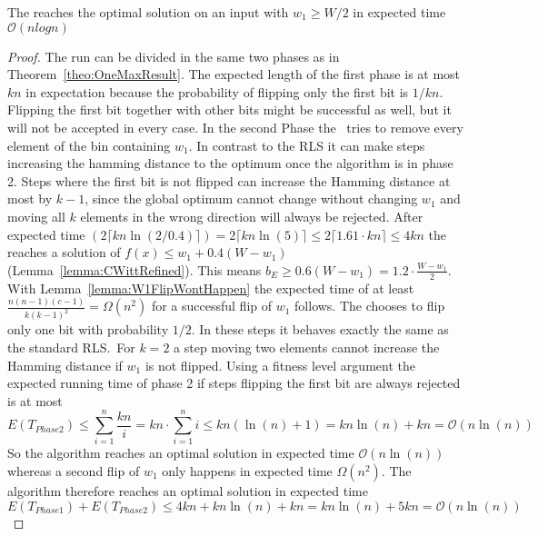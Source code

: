 \begin{lemma}
      The \RLSR[k=2] reaches the optimal solution on an input with $w_1\ge W/2$ in expected time $\mathcal{O}(nlogn)$
\end{lemma}
\begin{proof}
      The run can be divided in the same two phases as in Theorem~\ref{theo:OneMaxResult}.
      The expected length of the first phase is at most $kn$ in expectation because the probability of flipping only the first bit is $1/kn$.
      Flipping the first bit together with other bits might be successful as well, but it will not be accepted in every case.\newline
      In the second Phase the \RLSR~tries to remove every element of the bin containing $w_1$.
      In contrast to the RLS it can make steps increasing the hamming distance to the optimum once the algorithm is in phase 2.
      Steps where the first bit is not flipped can increase the Hamming distance at most by $k-1$, since the global optimum cannot change without changing $w_1$ and moving all $k$ elements in the wrong direction will always be rejected.
      After expected time $(2\lceil kn\ln(2/0.4)\rceil)=2\lceil kn\ln(5)\rceil\le2\lceil 1.61\cdot kn\rceil\le4kn$ the \RLSR[k] reaches a solution of \(f(x)\le w_1+0.4(W-w_1)\) (Lemma~\ref{lemma:CWittRefined}).
      This means \(b_E \ge 0.6(W-w_1) = 1.2\cdot\frac{W-w_1}{2}\).
      With Lemma~\ref{lemma:W1FlipWontHappen} the expected time of at least \(\frac{n(n-1)(c-1)}{k{(k-1)}^2}=\Omega(n^2)\) for a successful flip of $w_1$ follows.\newline
      The \RLSR[2] chooses to flip only one bit with probability $1/2$.
      In these steps it behaves exactly the same as the standard RLS.\
      For $k=2$ a step moving two elements cannot increase the Hamming distance if $w_1$ is not flipped.
      Using a fitness level argument the expected running time of phase 2 if steps flipping the first bit are always rejected is at most
      \[
            E(T_{Phase 2})
            \le \sum_{i=1}^{n}{\frac{kn}{i}}
            = kn\cdot\sum_{i=1}^{n}{i}
            \le kn(\ln(n)+1)
            = kn\ln(n)+kn
            = \mathcal{O}(n\ln(n))
      \]
      So the algorithm reaches an optimal solution in expected time $\mathcal{O}(n\ln(n))$ whereas a second flip of $w_1$ only happens in expected time $\Omega(n^2)$.
      The algorithm therefore reaches an optimal solution in expected time
      \[E(T_{Phase 1}) + E(T_{Phase 2})
      \le 4kn + kn\ln(n)+kn
      = kn\ln(n)+5kn
      = \mathcal{O}(n\ln(n))\]
\end{proof}